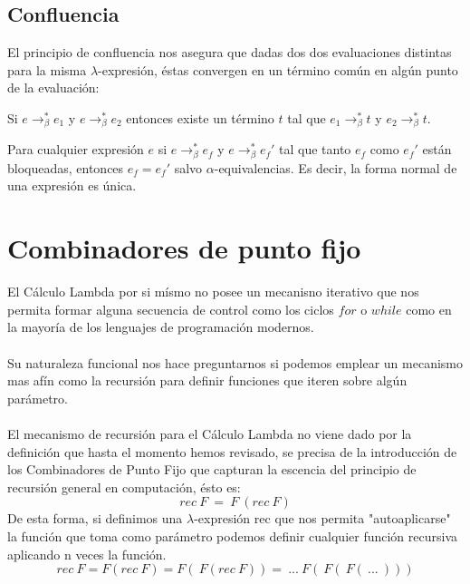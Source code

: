                 \subsection{Confluencia}
                    El principio de confluencia nos asegura que dadas dos dos evaluaciones distintas para la misma $\lambda$-expresión, éstas convergen en un término común en algún punto de la evaluación:

                    \begin{theorem} Si $e\to_\beta^* e_1$ y $e\to_\beta^*e_2$ entonces existe un término $t$ tal que  $e_1\to_\beta^* t$ y $e_2\to_\beta^* t$.
                    \end{theorem}


                    \begin{corollary} Para cualquier expresión $e$ si $e\to_\beta^*e_f$ y $e\to_\beta^*e_f'$ tal que tanto $e_f$ como $e_f'$ están bloqueadas, entonces $e_f = e_f'$ salvo $\alpha$-equivalencias. Es decir, la forma normal de una expresión es única.
                    \end{corollary}

        \section{Combinadores de punto fijo}
                    El Cálculo Lambda por si mísmo no posee un mecanisno iterativo que nos permita formar alguna secuencia de control como los ciclos $for$ o $while$ como en la mayoría de los lenguajes de programación modernos.\\\\
                    Su naturaleza funcional nos hace preguntarnos si podemos emplear un mecanismo mas afín como la recursión para definir funciones que iteren sobre algún parámetro.\\\\
                    El mecanismo de recursión para el Cálculo Lambda no viene dado por la definición que hasta el momento hemos revisado, se precisa de la introducción de los Combinadores de Punto Fijo que capturan la escencia del principio de recursión general en computación, ésto es:
                    $$ rec\ F\ =\ F\ (rec\ F) $$
                    De esta forma, si definimos una $\lambda$-expresión rec que nos permita "autoaplicarse" la función que toma como parámetro podemos definir cualquier función recursiva aplicando n veces la función.
                    $$rec\ F = F(rec\ F) = F(\ F(rec\ F)) =\ ...\ F(\ F(\ F(\ ...\ )))$$
                    
